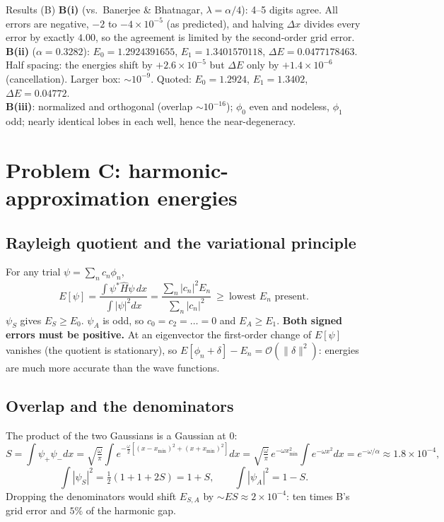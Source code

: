 \documentclass[10pt]{article}
\begin{document}
\begin{resbox}{Results (B)}
\textbf{B(i)} (vs.\ Banerjee \& Bhatnagar, $\lambda=\alpha/4$): 4--5 digits agree. All errors are negative, $-2$ to $-4\times10^{-5}$ (as predicted), and halving $\Delta x$ divides every error by exactly $4.00$, so the agreement is limited by the second-order grid error.\\
\textbf{B(ii)} ($\alpha=0.3282$): $E_0=1.2924391655$, $E_1=1.3401570118$, $\Delta E=0.0477178463$. Half spacing: the energies shift by $+2.6\times10^{-5}$ but $\Delta E$ only by $+1.4\times10^{-6}$ (cancellation). Larger box: $\sim10^{-9}$. Quoted: $E_0=1.2924$, $E_1=1.3402$, $\Delta E=0.04772$.\\
\textbf{B(iii)}: normalized and orthogonal (overlap $\sim10^{-16}$); $\phi_0$ even and nodeless, $\phi_1$ odd; nearly identical lobes in each well, hence the near-degeneracy.
\end{resbox}

\section{Problem C: harmonic-approximation energies}
\subsection{Rayleigh quotient and the variational principle}
For any trial $\psi=\sum_nc_n\phi_n$,
\[
E[\psi]=\frac{\int\psi^*\hat H\psi\,dx}{\int|\psi|^2dx}=\frac{\sum_n|c_n|^2E_n}{\sum_n|c_n|^2}\ \ge\ \text{lowest }E_n\text{ present}.
\]
$\psi_S$ gives $E_S\ge E_0$. $\psi_A$ is odd, so $c_0=c_2=\dots=0$ and $E_A\ge E_1$. \textbf{Both signed errors must be positive.} At an eigenvector the first-order change of $E[\psi]$ vanishes (the quotient is stationary), so $E[\phi_n+\delta]-E_n=\mathcal O(\|\delta\|^2)$: energies are much more accurate than the wave functions.

\subsection{Overlap and the denominators}
The product of the two Gaussians is a Gaussian at $0$:
\[
S=\int\psi_+\psi_-dx=\sqrt{\tfrac\omega\pi}\int e^{-\frac\omega2[(x-x_{\min})^2+(x+x_{\min})^2]}dx=\sqrt{\tfrac\omega\pi}\,e^{-\omega x_{\min}^2}\int e^{-\omega x^2}dx=e^{-\omega/\alpha}\approx1.8\times10^{-4},
\]
\[
\int|\psi_S|^2=\tfrac12(1+1+2S)=1+S,\qquad\int|\psi_A|^2=1-S .
\]
Dropping the denominators would shift $E_{S,A}$ by $\sim ES\approx2\times10^{-4}$: ten times B's grid error and $5\%$ of the harmonic gap.
\end{document}
